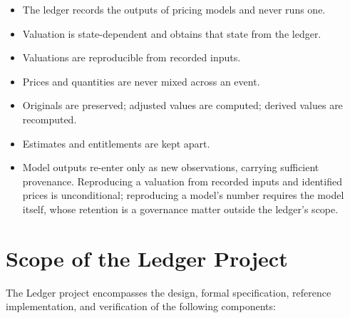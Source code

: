 \documentclass[11pt,a4paper]{article}
\newcommand{\clabel}[1]{\leavevmode\hypertarget{clause-#1}{}%
  \marginpar{\raggedright\scriptsize\ttfamily\textcolor{gray}{#1}}}
\providecommand{\tightlist}{\setlength{\itemsep}{2pt}\setlength{\parskip}{0pt}}
\begin{document}
\begin{itemize}
\tightlist
\item
  \clabel{C-14.9}The ledger records the outputs of pricing models and never runs one.
\item
  \clabel{C-14.10}Valuation is state-dependent and obtains that state from the ledger.
\item
  \clabel{C-14.11}Valuations are reproducible from recorded inputs.
\item
  \clabel{C-14.12}Prices and quantities are never mixed across an event.
\item
  \clabel{C-14.13}Originals are preserved; adjusted values are computed; derived values
  are recomputed.
\item
  \clabel{C-14.14}Estimates and entitlements are kept apart.
\item
  \clabel{C-14.15}Model outputs re-enter only as new observations, carrying sufficient
  provenance. Reproducing a valuation from recorded inputs and
  identified prices is unconditional; reproducing a model's number
  requires the model itself, whose retention is a governance matter
  outside the ledger's scope.
\end{itemize}

\hypertarget{scope-of-the-ledger-project}{%
\section{Scope of the Ledger
Project}\label{scope-of-the-ledger-project}}

\clabel{C-Scope.1}The Ledger project encompasses the design, formal specification,
reference implementation, and verification of the following components:
\end{document}
